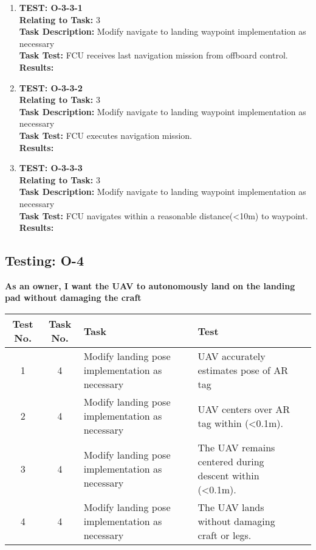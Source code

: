 \begin{enumerate}
\item \textbf{TEST: O-3-3-1}\\
\textbf{Relating to Task:} 3\\
\textbf{Task Description:} Modify navigate to landing waypoint implementation as necessary\\
\textbf{Task Test:} FCU receives last navigation mission from offboard control.\\
\textbf{Results:} 

\item \textbf{TEST: O-3-3-2}\\
\textbf{Relating to Task:} 3\\
\textbf{Task Description:} Modify navigate to landing waypoint implementation as necessary\\
\textbf{Task Test:} FCU executes navigation mission.\\
\textbf{Results:}  

\item \textbf{TEST: O-3-3-3}\\
\textbf{Relating to Task:} 3\\
\textbf{Task Description:} Modify navigate to landing waypoint implementation as necessary\\
\textbf{Task Test:} FCU navigates within a reasonable distance(\textless 10m) to waypoint.\\
\textbf{Results:} 
\end{enumerate}


\subsection{Testing: O-4}
\textbf{As an owner, I want the UAV to autonomously land on the landing pad without damaging the craft}\\
\begin{tabular}{| c | c | >{\raggedright}m{4cm} | m{4cm} | c |}\hline
	Test No. & Task No. & Task & Test \\\hline
	1 & 4 & Modify landing pose implementation as necessary & UAV accurately estimates pose of AR tag\\\hline
	2 & 4 & Modify landing pose implementation as necessary & UAV centers over AR tag within (\textless 0.1m).\\\hline
	3 & 4 & Modify landing pose implementation as necessary & The UAV remains centered during descent within (\textless 0.1m).\\\hline
	4 & 4 & Modify landing pose implementation as necessary & The UAV lands without damaging craft or legs.\\\hline
\end{tabular}


